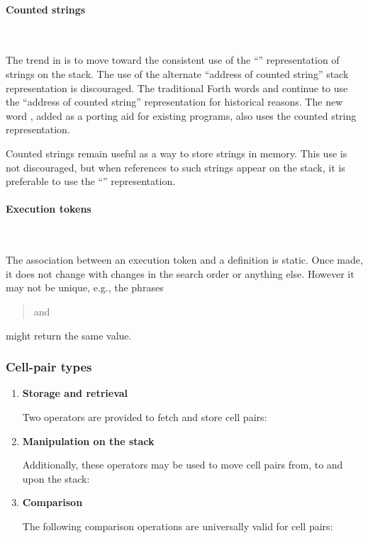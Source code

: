 \paragraph{Counted strings} ~ %
\label{rat:cstring}

The trend in  is to move toward the consistent use of the
``'' representation of strings on the stack. The use
of the alternate ``address of counted string'' stack representation
is discouraged. The traditional Forth words  and 
continue to use the ``address of counted string'' representation for
historical reasons. The new word , added as a porting aid for
existing programs, also uses the counted string representation.

Counted strings remain useful as a way to store strings in memory.
This use is not discouraged, but when references to such strings
appear on the stack, it is preferable to use the ``''
representation.


\paragraph{Execution tokens} ~ %

The association between an execution token and a definition is static.
Once made, it does not change with changes in the search order or
anything else. However it may not be unique, e.g., the phrases
\begin{quote}\ttfamily
	  and \\
	 
\end{quote}
might return the same value.


\subsubsection{Cell-pair types} %

\begin{enumerate}
\item \textbf{Storage and retrieval}

	Two operators are provided to fetch and store cell pairs:
	\begin{quote}\ttfamily
			
	\end{quote}

\item \textbf{Manipulation on the stack}

	Additionally, these operators may be used to move cell pairs
	from, to and upon the stack:
	\begin{quote}\ttfamily
					
				
	\end{quote}

\item \textbf{Comparison}

	The following comparison operations are universally valid for
	cell pairs:
	\begin{quote}\ttfamily
			
	\end{quote}
\end{enumerate}


